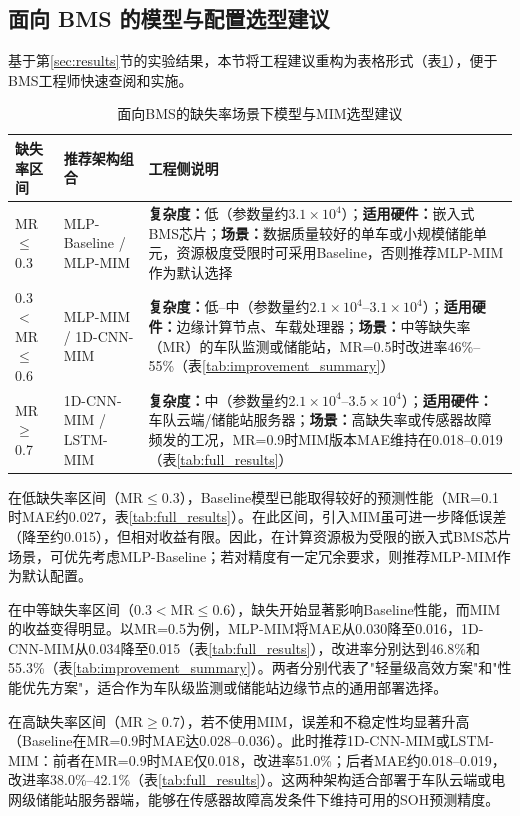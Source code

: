 \documentclass[10pt,a4paper]{ctexart}
\begin{document}
\subsection{面向 BMS 的模型与配置选型建议}

基于第\ref{sec:results}节的实验结果，本节将工程建议重构为表格形式（表\ref{tab:bms_selection}），便于BMS工程师快速查阅和实施。

\begin{table}[H]
\centering
\small
\caption{面向BMS的缺失率场景下模型与MIM选型建议}
\label{tab:bms_selection}
\begin{tabular}{@{}p{2.5cm}p{4cm}p{6cm}@{}}
\toprule
\textbf{缺失率区间} & \textbf{推荐架构组合} & \textbf{工程侧说明} \\
\midrule
MR$\leq$0.3 & MLP-Baseline / MLP-MIM & \textbf{复杂度：}低（参数量约$3.1\times10^4$）；\textbf{适用硬件：}嵌入式BMS芯片；\textbf{场景：}数据质量较好的单车或小规模储能单元，资源极度受限时可采用Baseline，否则推荐MLP-MIM作为默认选择 \\
\midrule
0.3$<$MR$\leq$0.6 & MLP-MIM / 1D-CNN-MIM & \textbf{复杂度：}低--中（参数量约$2.1\times10^4$--$3.1\times10^4$）；\textbf{适用硬件：}边缘计算节点、车载处理器；\textbf{场景：}中等缺失率（MR）的车队监测或储能站，MR=0.5时改进率46\%--55\%（表\ref{tab:improvement_summary}） \\
\midrule
MR$\geq$0.7 & 1D-CNN-MIM / LSTM-MIM & \textbf{复杂度：}中（参数量约$2.1\times10^4$--$3.5\times10^4$）；\textbf{适用硬件：}车队云端/储能站服务器；\textbf{场景：}高缺失率或传感器故障频发的工况，MR=0.9时MIM版本MAE维持在0.018--0.019（表\ref{tab:full_results}） \\
\bottomrule
\end{tabular}
\end{table}

在低缺失率区间（MR$\leq$0.3），Baseline模型已能取得较好的预测性能（MR=0.1时MAE约0.027，表\ref{tab:full_results}）。在此区间，引入MIM虽可进一步降低误差（降至约0.015），但相对收益有限。因此，在计算资源极为受限的嵌入式BMS芯片场景，可优先考虑MLP-Baseline；若对精度有一定冗余要求，则推荐MLP-MIM作为默认配置。

在中等缺失率区间（0.3$<$MR$\leq$0.6），缺失开始显著影响Baseline性能，而MIM的收益变得明显。以MR=0.5为例，MLP-MIM将MAE从0.030降至0.016，1D-CNN-MIM从0.034降至0.015（表\ref{tab:full_results}），改进率分别达到46.8\%和55.3\%（表\ref{tab:improvement_summary}）。两者分别代表了"轻量级高效方案"和"性能优先方案"，适合作为车队级监测或储能站边缘节点的通用部署选择。

在高缺失率区间（MR$\geq$0.7），若不使用MIM，误差和不稳定性均显著升高（Baseline在MR=0.9时MAE达0.028--0.036）。此时推荐1D-CNN-MIM或LSTM-MIM：前者在MR=0.9时MAE仅0.018，改进率51.0\%；后者MAE约0.018--0.019，改进率38.0\%--42.1\%（表\ref{tab:full_results}）。这两种架构适合部署于车队云端或电网级储能站服务器端，能够在传感器故障高发条件下维持可用的SOH预测精度。
\end{document}
